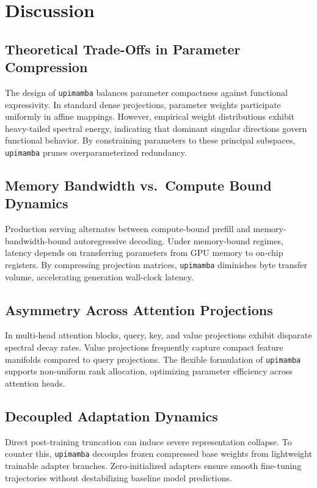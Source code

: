 \section{Discussion}

\subsection{Theoretical Trade-Offs in Parameter Compression}
The design of \texttt{upimamba} balances parameter compactness against functional expressivity. In standard dense projections, parameter weights participate uniformly in affine mappings. However, empirical weight distributions exhibit heavy-tailed spectral energy, indicating that dominant singular directions govern functional behavior. By constraining parameters to these principal subspaces, \texttt{upimamba} prunes overparameterized redundancy.

\subsection{Memory Bandwidth vs.\ Compute Bound Dynamics}
Production serving alternates between compute-bound prefill and memory-bandwidth-bound autoregressive decoding. Under memory-bound regimes, latency depends on transferring parameters from GPU memory to on-chip registers. By compressing projection matrices, \texttt{upimamba} diminishes byte transfer volume, accelerating generation wall-clock latency.

\subsection{Asymmetry Across Attention Projections}
In multi-head attention blocks, query, key, and value projections exhibit disparate spectral decay rates. Value projections frequently capture compact feature manifolds compared to query projections. The flexible formulation of \texttt{upimamba} supports non-uniform rank allocation, optimizing parameter efficiency across attention heads.

\subsection{Decoupled Adaptation Dynamics}
Direct post-training truncation can induce severe representation collapse. To counter this, \texttt{upimamba} decouples frozen compressed base weights from lightweight trainable adapter branches. Zero-initialized adapters ensure smooth fine-tuning trajectories without destabilizing baseline model predictions.

